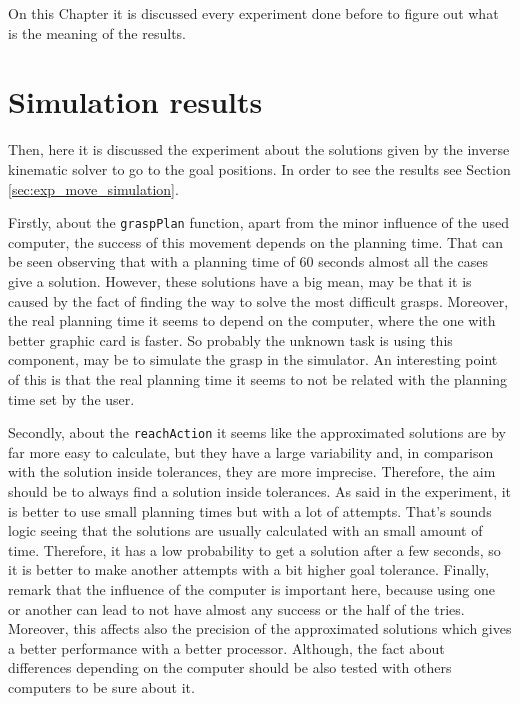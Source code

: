 \documentclass[12pt,a4paper,final,twoside,openright]{report}
\begin{document}

On this Chapter it is discussed every experiment done before to figure out what is the meaning of the results.

\vspace{-20pt}
\section{Simulation results}

Then, here it is discussed the experiment about the solutions given by the inverse kinematic solver to go to the goal positions. In order to see the results see Section \ref{sec:exp_move_simulation}.

Firstly, about the \texttt{graspPlan} function, apart from the minor influence of the used computer, the success of this movement depends on the planning time. That can be seen observing that with a planning time of 60 seconds almost all the cases give a solution. However, these solutions have a big mean, may be that it is caused by the fact of finding the way to solve the most difficult grasps. Moreover, the real planning time it seems to depend on the computer, where the one with better graphic card is faster. So probably the unknown task is using this component, may be to simulate the grasp in the simulator. An interesting point of this is that the real planning time it seems to not be related with the planning time set by the user. 

Secondly, about the \texttt{reachAction} it seems like the approximated solutions are by far more easy to calculate, but they have a large variability and, in comparison with the solution inside tolerances, they are more imprecise. Therefore, the aim should be to always find a solution inside tolerances. As said in the experiment, it is better to use small planning times but with a lot of attempts. That's sounds logic seeing that the solutions are usually calculated with an small amount of time. Therefore, it has a low probability to get a solution after a few seconds, so it is better to make another attempts with a bit higher goal tolerance. Finally, remark that the influence of the computer is important here, because using one or another can lead to not have almost any success or the half of the tries. Moreover, this affects also the precision of the approximated solutions which gives a better performance with a better processor. Although, the fact about differences depending on the computer should be also tested with others computers to be sure about it.
\end{document}

